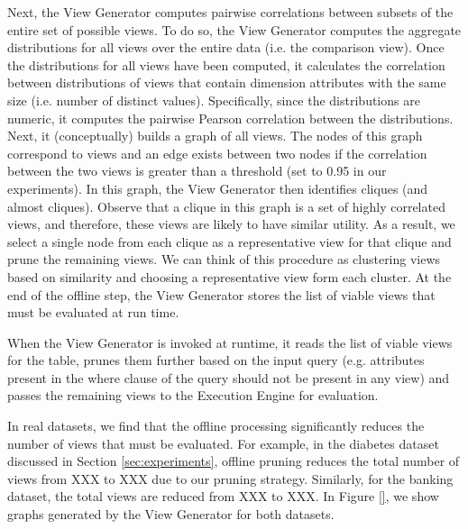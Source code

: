 Next, the View Generator computes pairwise correlations between subsets of the
entire set of possible views.
To do so, the View Generator computes the aggregate distributions for all views
over the entire data (i.e. the comparison view). 
Once the distributions for all views have been computed, it calculates the
correlation between distributions of views that contain dimension attributes
with the same size (i.e. number of distinct values).
Specifically, since the distributions are numeric, it computes the pairwise
Pearson correlation between the distributions.
Next, it (conceptually) builds a graph of all views. 
The nodes of this graph correspond to views and an edge exists between two nodes
if the correlation between the two views is greater than a threshold (set to 0.95 in
our experiments). 
In this graph, the View Generator then identifies cliques (and almost cliques).
Observe that a clique in this graph is a set of highly correlated views,
and therefore, these views are likely to have similar utility. 
As a result, we select a
single node from each clique as a representative view for that clique and
prune the remaining views. 
We can think of this procedure as clustering views based on similarity and
choosing a representative view form each cluster.
At the end of the offline step, the View Generator stores the list of
viable views that must be evaluated at run time.

When the View Generator is invoked at runtime, it reads the list of viable
views for the table, prunes them further based on the input query (e.g.
attributes present in the where clause of the query should not be present in
any view) and passes the remaining views to the Execution Engine for
evaluation.

In real datasets, we find that the offline processing significantly
reduces the number of views that must be evaluated. 
For example, in the
diabetes dataset discussed in Section \ref{sec:experiments}, offline pruning
reduces the total number of views from XXX to XXX due to our pruning
strategy. Similarly, for the banking dataset, the total views are
reduced from XXX to XXX. In Figure \ref{}, we show graphs generated by the
View Generator for both datasets.
